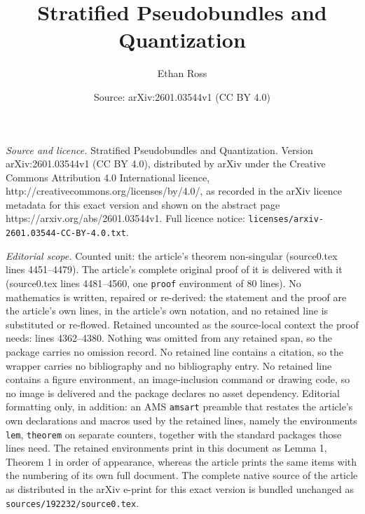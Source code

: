 \documentclass[10pt,a4paper]{amsart}
\title{Stratified Pseudobundles and Quantization}
\author{Ethan Ross}
\date{Source: arXiv:2601.03544v1 (CC BY 4.0)}
\begin{document}
\maketitle

\noindent\emph{Source and licence.} Stratified Pseudobundles and Quantization. Version arXiv:2601.03544v1 (CC BY 4.0), distributed by arXiv under the Creative Commons Attribution 4.0 International licence, http://creativecommons.org/licenses/by/4.0/, as recorded in the arXiv licence metadata for this exact version and shown on the abstract page https://arxiv.org/abs/2601.03544v1. Full licence notice: \texttt{licenses/arxiv-2601.03544-CC-BY-4.0.txt}.\par\smallskip

\noindent\textit{Editorial scope.} Counted unit: the article's theorem non-singular (source0.tex lines 4451--4479). The article's complete original proof of it is delivered with it (source0.tex lines 4481--4560, one \texttt{proof} environment of 80 lines). No mathematics is written, repaired or re-derived: the statement and the proof are the article's own lines, in the article's own notation, and no retained line is substituted or re-flowed.  Retained uncounted as the source-local context the proof needs: lines 4362--4380.  Nothing was omitted from any retained span, so the package carries no omission record.  No retained line contains a citation, so the wrapper carries no bibliography and no bibliography entry.  No retained line contains a figure environment, an image-inclusion command or drawing code, so no image is delivered and the package declares no asset dependency.  Editorial formatting only, in addition: an AMS \texttt{amsart} preamble that restates the article's own declarations and macros used by the retained lines, namely the environments \texttt{lem}, \texttt{theorem} on separate counters, together with the standard packages those lines need.  The retained environments print in this document as Lemma 1, Theorem 1 in order of appearance, whereas the article prints the same items with the numbering of its own full document.  The complete native source of the article as distributed in the arXiv e-print for this exact version is bundled unchanged as \texttt{sources/192232/source0.tex}.
\end{document}
